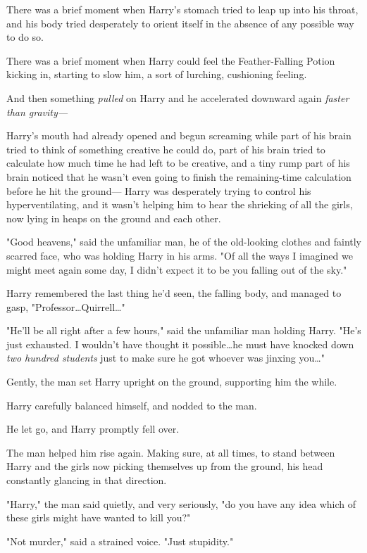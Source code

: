 There was a brief moment when Harry's stomach tried to leap up into his throat,
and his body tried desperately to orient itself in the absence of any possible
way to do so.

There was a brief moment when Harry could feel the Feather-Falling Potion
kicking in, starting to slow him, a sort of lurching, cushioning feeling.

And then something \emph{pulled} on Harry and he accelerated downward again
\emph{faster than gravity---}

Harry's mouth had already opened and begun screaming while part of his brain
tried to think of something creative he could do, part of his brain tried to
calculate how much time he had left to be creative, and a tiny rump part of his
brain noticed that he wasn't even going to finish the remaining-time
calculation before he hit the ground---
\later
Harry was desperately trying to control his hyperventilating, and it wasn't
helping him to hear the shrieking of all the girls, now lying in heaps on the
ground and each other.

"Good heavens," said the unfamiliar man, he of the old-looking clothes and
faintly scarred face, who was holding Harry in his arms. "Of all the ways I
imagined we might meet again some day, I didn't expect it to be you falling out
of the sky."

Harry remembered the last thing he'd seen, the falling body, and managed to
gasp, "Professor…Quirrell…"

"He'll be all right after a few hours," said the unfamiliar man holding Harry.
"He's just exhausted. I wouldn't have thought it possible…he must have
knocked down \emph{two hundred students} just to make sure he got whoever was
jinxing you…"

Gently, the man set Harry upright on the ground, supporting him the while.

Harry carefully balanced himself, and nodded to the man.

He let go, and Harry promptly fell over.

The man helped him rise again. Making sure, at all times, to stand between
Harry and the girls now picking themselves up from the ground, his head
constantly glancing in that direction.

"Harry," the man said quietly, and very seriously, "do you have any idea which
of these girls might have wanted to kill you?"

"Not murder," said a strained voice. "Just stupidity."

